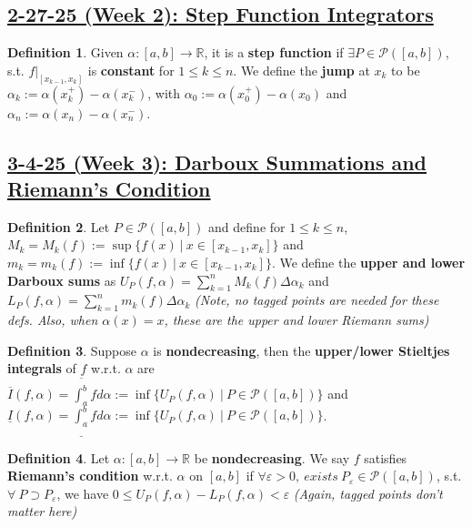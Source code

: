 \documentclass[12pt,a4paper]{article}
\theoremstyle{definition}
\newtheorem{defin}{Definition}[subsection]
\newenvironment{definition}{
  \begin{defin}
}{
  \end{defin}
  \vspace{0.125em}
}
\begin{document}
\subsection*{\underline{\textbf{2-27-25 (Week 2): Step Function Integrators}}}
\begin{definition}
  Given $\alpha: [a, b] \to \mathbb{R}$, it is a \textbf{step function} if $\exists P \in \mathcal{P}([a, b])$, s.t. \underline{$f|_{[x_{k - 1}, x_k]}$} is \textbf{constant} for $1 \leq k \leq n$. We define the \textbf{jump} at $x_k$ to be \underline{$\alpha_k := \alpha(x_k^+) - \alpha(x_k^-)$}, with $\alpha_0 := \alpha(x_0^+) - \alpha(x_0)$ and $\alpha_n := \alpha(x_n) - \alpha(x_n^-)$.
\end{definition}

\setcounter{defin}{0}
\setcounter{ex}{0}
\subsection*{\underline{\textbf{3-4-25 (Week 3): Darboux Summations and Riemann's Condition}}}
\begin{definition}
  Let $P \in \mathcal{P}([a, b])$ and define for $1 \leq k \leq n$, $M_k = M_k(f):= \sup \{f(x)\ |\ x \in [x_{k - 1}, x_k]\}$ and $m_k = m_k(f) := \inf \{f(x)\ |\ x \in [x_{k - 1}, x_k]\}$. We define the \textbf{upper and lower Darboux sums} as \underline{$U_P(f, \alpha) = \sum_{k = 1}^n M_k(f) \Delta \alpha_k$} and \underline{$L_P(f, \alpha) = \sum_{k = 1}^n m_k(f) \Delta \alpha_k$} \textit{(Note, no tagged points are needed for these defs. Also, when $\alpha(x) = x$, these are the upper and lower Riemann sums)}
\end{definition}

\begin{definition}
  Suppose $\alpha$ is \textbf{nondecreasing}, then the \textbf{upper/lower Stieltjes integrals} of $f$ w.r.t. $\alpha$ are \underline{$\overline{I}(f, \alpha) = \overline{\int_a^b} f d \alpha := \inf \{U_P(f, \alpha)\ |\ P \in \mathcal{P}([a, b])\}$} and \underline{$\underline{I}(f, \alpha) = \underline{\int_a^b} f d \alpha := \inf \{U_P(f, \alpha)\ |\ P \in \mathcal{P}([a, b])\}$}.
\end{definition}

\begin{definition}
  Let $\alpha: [a, b] \to \mathbb{R}$ be \textbf{nondecreasing}. We say $f$ satisfies \textbf{Riemann's condition} w.r.t. $\alpha$ on $[a, b]$ if $\forall \varepsilon > 0,\ exists\ P_\varepsilon \in \mathcal{P}([a, b])$, s.t. $\forall\ P \supset P_\varepsilon$, we have \underline{$0 \leq U_P(f, \alpha) - L_P(f, \alpha) < \varepsilon$} \textit{(Again, tagged points don't matter here)}
\end{definition}
\end{document}
